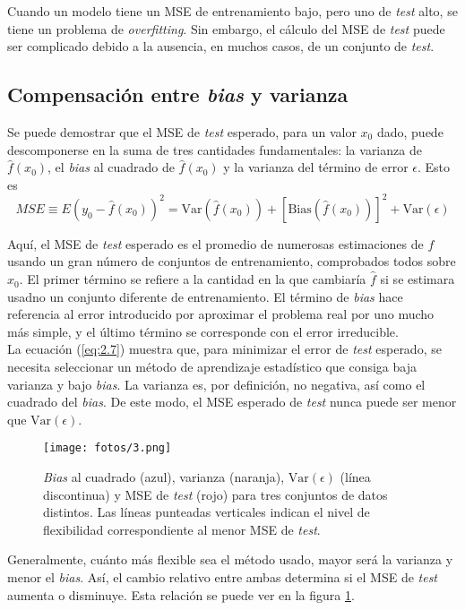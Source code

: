 Cuando un modelo tiene un MSE de entrenamiento bajo, pero uno de \textit{test} alto, se tiene un problema de \textit{overfitting}. Sin embargo, el cálculo del MSE de \textit{test} puede ser complicado debido a la ausencia, en muchos casos, de un conjunto de \textit{test}. 

\subsection{Compensación entre \textit{bias} y varianza}

Se puede demostrar que el MSE de \textit{test} esperado, para un valor $x_0$ dado, puede descomponerse en la suma de tres cantidades fundamentales: la varianza de $\hat{f}(x_0)$, el \textit{bias} al cuadrado de $\hat{f}(x_0)$ y la varianza del término de error $\epsilon$. Esto es 
\begin{equation}
MSE \equiv E(y_0 - \hat{f}(x_0))^2 = \text{Var}(\hat{f}(x_0)) + [\text{Bias}(\hat{f}(x_0))]^2 + \text{Var}(\epsilon)
\label{eq:2.7}
\end{equation}

Aquí, el MSE de \textit{test} esperado es el promedio de numerosas estimaciones de $f$ usando un gran número de conjuntos de entrenamiento, comprobados todos sobre $x_0$. El primer término se refiere a la cantidad en la que cambiaría $\hat{f}$ si se estimara usadno un conjunto diferente de entrenamiento. El término de \textit{bias} hace referencia al error introducido por aproximar el problema real por uno mucho más simple, y el último término se corresponde con el error irreducible. \\

La ecuación (\ref{eq:2.7}) muestra que, para minimizar el error de \textit{test} esperado, se necesita seleccionar un método de aprendizaje estadístico que consiga baja varianza y bajo \textit{bias}. La varianza es, por definición, no negativa, así como el cuadrado del \textit{bias}. De este modo, el MSE esperado de \textit{test} nunca puede ser menor que $\text{Var}(\epsilon)$. \\

\begin{figure}[h]
\centering
\texttt{[image: fotos/3.png]}
\caption{\textit{Bias} al cuadrado (azul), varianza (naranja), $\text{Var}(\epsilon)$ (línea discontinua) y MSE de \textit{test} (rojo) para tres conjuntos de datos distintos. Las líneas punteadas verticales indican el nivel de flexibilidad correspondiente al menor MSE de \textit{test}.}
\label{fig:3}
\end{figure}

Generalmente, cuánto más flexible sea el método usado, mayor será la varianza y menor el \textit{bias}. Así, el cambio relativo entre ambas determina si el MSE de \textit{test} aumenta o disminuye. Esta relación se puede ver en la figura \ref{fig:3}.